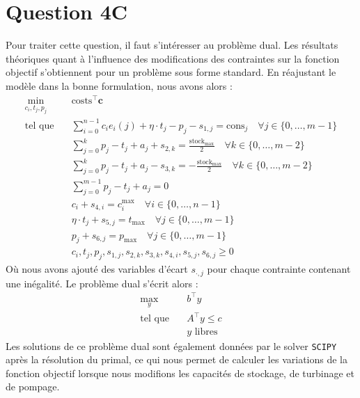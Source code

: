 \documentclass{article}
\begin{document}
\clearpage
\section*{Question 4C}
Pour traiter cette question, il faut s'intéresser au problème dual. Les résultats théoriques quant à l'influence des modifications des contraintes sur la fonction objectif s'obtiennent pour un problème sous forme standard.
En réajustant le modèle dans la bonne formulation, nous avons alors :
\begin{align}
    \min_{c_{i},t_j,p_j} \quad &\mathrm{costs}^\intercal\mathbf{c} \nonumber\\
    \textrm{tel que} \quad & \sum_{i=0}^{n-1} c_i e_i(j) + \eta \cdot t_j - p_j - s_{1,j} = \mathrm{cons}_j \quad \forall j \in  \{ 0, \ldots, m-1 \} \label{eq:4C_contr1}\\
    &\sum_{j=0}^{k} p_j - t_j + a_j + s_{2,k} =  \frac{\mathrm{stock}_\mathrm{max}}{2} \quad \forall k \in \{ 0, \ldots, m-2 \} \label{eq:4C_contr2}\\
    &\sum_{j=0}^{k} p_j - t_j + a_j - s_{3,k} =  -\frac{\mathrm{stock}_\mathrm{max}}{2} \quad \forall k \in \{ 0, \ldots, m-2 \} \label{eq:4C_contr3}\\
    & \sum_{j=0}^{m-1} p_j - t_j + a_j = 0\\
    &c_i + s_{4,i} = c_i^\mathrm{max} \quad \forall i \in  \{ 0, \ldots, n-1 \}\\
    &\eta \cdot t_j + s_{5,j} = t_\mathrm{max} \quad \forall j \in  \{ 0, \ldots, m-1 \} \label{eq:4C_contr6}\\
    &p_j + s_{6,j} = p_\mathrm{max} \quad \forall j \in  \{ 0, \ldots, m-1 \} \label{eq:4C_contr7}\\
    & c_i, t_j, p_j, s_{1,j}, s_{2,k}, s_{3,k}, s_{4,i}, s_{5,j}, s_{6,j} \geq 0
\end{align}
Où nous avons ajouté des variables d'écart $s_{\cdot,j}$ pour chaque contrainte contenant une inégalité.
Le problème dual s'écrit alors :
\begin{align*}
    \max_{y} \quad &b^\intercal y \quad\\ 
    \textrm{tel que} \quad &A^\intercal y \leq c\\
    & y \text{ libres}
\end{align*}
Les solutions de ce problème dual sont également données par le solver \verb|SCIPY| après la résolution du primal, ce qui nous permet de calculer les variations de la fonction objectif
lorsque nous modifions les capacités de stockage, de turbinage et de pompage.
\end{document}
